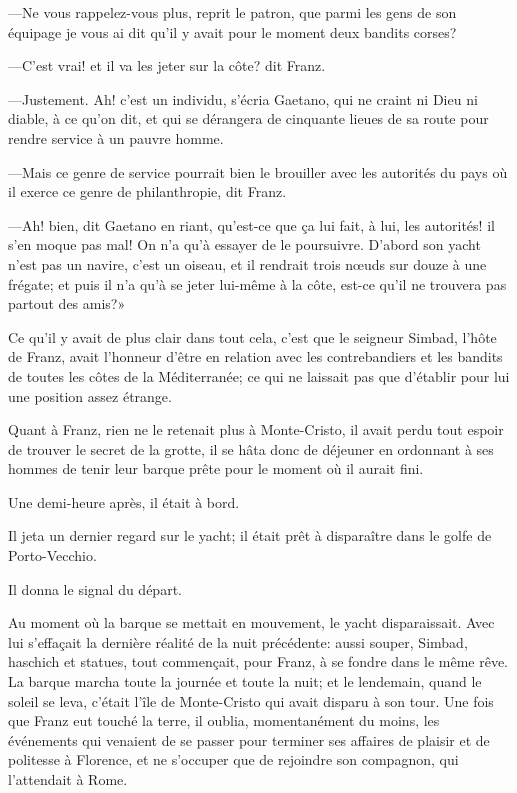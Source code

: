 —Ne vous rappelez-vous plus, reprit le patron, que parmi les gens de son équipage je vous ai dit qu'il y avait pour le moment deux bandits corses? 

—C'est vrai! et il va les jeter sur la côte? dit Franz. 

—Justement. Ah! c'est un individu, s'écria Gaetano, qui ne craint ni Dieu ni diable, à ce qu'on dit, et qui se dérangera de cinquante lieues de sa route pour rendre service à un pauvre homme. 

—Mais ce genre de service pourrait bien le brouiller avec les autorités du pays où il exerce ce genre de philanthropie, dit Franz. 

—Ah! bien, dit Gaetano en riant, qu'est-ce que ça lui fait, à lui, les autorités! il s'en moque pas mal! On n'a qu'à essayer de le poursuivre. D'abord son yacht n'est pas un navire, c'est un oiseau, et il rendrait trois nœuds sur douze à une frégate; et puis il n'a qu'à se jeter lui-même à la côte, est-ce qu'il ne trouvera pas partout des amis?» 

Ce qu'il y avait de plus clair dans tout cela, c'est que le seigneur Simbad, l'hôte de Franz, avait l'honneur d'être en relation avec les contrebandiers et les bandits de toutes les côtes de la Méditerranée; ce qui ne laissait pas que d'établir pour lui une position assez étrange. 

Quant à Franz, rien ne le retenait plus à Monte-Cristo, il avait perdu tout espoir de trouver le secret de la grotte, il se hâta donc de déjeuner en ordonnant à ses hommes de tenir leur barque prête pour le moment où il aurait fini. 

Une demi-heure après, il était à bord.  

Il jeta un dernier regard sur le yacht; il était prêt à disparaître dans le golfe de Porto-Vecchio. 

Il donna le signal du départ. 

Au moment où la barque se mettait en mouvement, le yacht disparaissait. Avec lui s'effaçait la dernière réalité de la nuit précédente: aussi souper, Simbad, haschich et statues, tout commençait, pour Franz, à se fondre dans le même rêve. La barque marcha toute la journée et toute la nuit; et le lendemain, quand le soleil se leva, c'était l'île de Monte-Cristo qui avait disparu à son tour. Une fois que Franz eut touché la terre, il oublia, momentanément du moins, les événements qui venaient de se passer pour terminer ses affaires de plaisir et de politesse à Florence, et ne s'occuper que de rejoindre son compagnon, qui l'attendait à Rome. 

